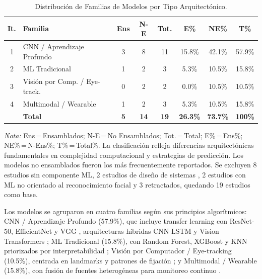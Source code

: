 \documentclass[ASNA,twocolumn]{USG}
\begin{document}
	\begin{table}[!ht]
		\centering
		\caption{Distribución de Familias de Modelos por Tipo Arquitectónico.\label{tab7}}
		{\setlength{\tabcolsep}{3pt}
			\begin{tabular*}{\columnwidth}{@{\extracolsep\fill}clcccccc@{\extracolsep\fill}}
				\toprule
				\textbf{It.} & \textbf{Familia} & \textbf{Ens} & \textbf{N-E} & \textbf{Tot.} &
				\textbf{E\%} & \textbf{NE\%} & \textbf{T\%} \\
				\midrule
				1 & \parbox[t]{1.8cm}{CNN / Aprendizaje Profundo} & 3 & 8  & 11 & 15.8\% & 42.1\% & 57.9\% \\[12pt]
				2 & ML Tradicional              & 1 & 2  & 3  & 5.3\%  & 10.5\% & 15.8\% \\
				3 & \parbox[t]{1.8cm}{Visión por Comp. / Eye-track.} & 0 & 2 & 2 & 0.0\% & 10.5\% & 10.5\% \\[12pt]
				4 & Multimodal / Wearable       & 1 & 2  & 3  & 5.3\%  & 10.5\% & 15.8\% \\
				& \textbf{Total}              & \textbf{5} & \textbf{14} & \textbf{19} &
				\textbf{26.3\%} & \textbf{73.7\%} & \textbf{100\%} \\
				\bottomrule
		\end{tabular*}}
		\begin{tablenotes}
			\item {\it Nota:} Ens\,=\,Ensamblados; N-E\,=\,No Ensamblados; Tot.\,=\,Total;
			E\%\,=\,Ens\%; NE\%\,=\,N-Ens\%; T\%\,=\,Total\%. La clasificación refleja
			diferencias arquitectónicas fundamentales en complejidad computacional y estrategias
			de predicción. Los modelos no ensamblados fueron los más frecuentemente reportados.
			Se excluyen 8 estudios sin componente ML, 2 estudios de diseño de sistemas
			\cite{Levy2024,Almeida2019}, 2 estudios con ML no orientado al reconocimiento facial
			\cite{Alsubai2025,OSullivan2023} y 3 retractados, quedando 19 estudios como base.
		\end{tablenotes}
	\end{table}
	
	Los modelos se agruparon en cuatro familias según sus principios algorítmicos:
	CNN / Aprendizaje Profundo (57.9\%), que incluye transfer learning con ResNet-50,
	EfficientNet y VGG \cite{Ahmad2024,Radocaj2025}, arquitecturas híbridas CNN-LSTM
	\cite{Aljbori2025,Rhatassi2025} y Vision Transformers \cite{Rhatassi2024,Radocaj2025};
	ML Tradicional (15.8\%), con Random Forest, XGBoost y KNN priorizados por
	interpretabilidad \cite{Hassan2025,AkinBulbul2024}; Visión por Computador /
	Eye-tracking (10.5\%), centrada en landmarks y patrones de fijación
	\cite{Sariyanidi2025,Dapogny2019}; y Multimodal / Wearable (15.8\%), con fusión de
	fuentes heterogéneas para monitoreo continuo \cite{Rudovic2018,Rudovic2019}.
	
\end{document}
